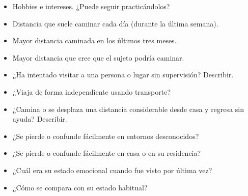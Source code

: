 \begin{itemize}
    \item Hobbies e intereses. ¿Puede seguir practicándolos?
    \item Distancia que suele caminar cada día (durante la última semana).
    \item Mayor distancia caminada en los últimos tres meses.
    \item Mayor distancia que cree que el sujeto podría caminar.
    \item ¿Ha intentado visitar a una persona o lugar sin supervisión? Describir.
    \item ¿Viaja de forma independiente usando transporte?
    \item ¿Camina o se desplaza una distancia considerable desde casa y regresa sin ayuda? Describir.
    \item ¿Se pierde o confunde fácilmente en entornos desconocidos?
    \item ¿Se pierde o confunde fácilmente en casa o en su residencia?
    \item ¿Cuál era su estado emocional cuando fue visto por última vez?
    \item ¿Cómo se compara con su estado habitual?
\end{itemize}


